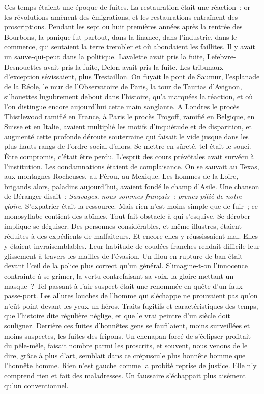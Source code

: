 \documentclass[french,twoside]{book} %
\begin{document}
Ces temps étaient une époque de fuites. La restauration était une réaction ; or les révolutions amènent des émigrations, et les restaurations entraînent des proscriptions. Pendant les sept ou huit premières années après la rentrée des Bourbons, la panique fut partout, dans la finance, dans l’industrie, dans le commerce, qui sentaient la terre trembler et où abondaient les faillites. Il y avait un sauve-qui-peut dans la politique. Lavalette avait pris la fuite, Lefebvre-Desnouettes avait pris la fuite, Delon avait pris la fuite. Les tribunaux d’exception sévissaient, plus Trestaillon. On fuyait le pont de Saumur, l’esplanade de la Réole, le mur de l’Observatoire de Paris, la tour de Taurias d’Avignon,  silhouettes lugubrement debout dans l’histoire, qu’a marquées la réaction, et où l’on distingue encore aujourd’hui cette main sanglante. A Londres le procès Thistlewood ramifié en France, à Paris le procès Trogoff, ramifié en Belgique, en Suisse et en Italie, avaient multiplié les motifs d’inquiétude et de disparition, et augmenté cette profonde déroute souterraine qui faisait le vide jusque dans les plus hauts rangs de l’ordre social d’alors. Se mettre en sûreté, tel était le souci. Être compromis, c’était être perdu. L’esprit des cours prévôtales avait survécu à l’institution. Les condamnations étaient de complaisance. On se sauvait au Texas, aux montagnes Rocheuses, au Pérou, au Mexique. Les hommes de la Loire, brigands alors, paladins aujourd’hui, avaient fondé le champ d’Asile. Une chanson de Béranger disait : \emph{Sauvages, nous sommes français ; prenez pitié de notre gloire}. S’expatrier était la ressource. Mais rien n’est moins simple que de fuir ; ce monosyllabe contient des abîmes. Tout fait obstacle à qui s’esquive. Se dérober implique se déguiser. Des personnes considérables, et même illustres, étaient réduites à des expédients de malfaiteurs. Et encore elles y réussissaient mal. Elles y étaient invraisemblables. Leur habitude de coudées franches rendait difficile leur glissement à travers les mailles de l’évasion. Un filou en rupture de ban était devant l’œil de la police plus correct qu’un général. S’imagine-t-on l’innocence contrainte à se grimer, la vertu contrefaisant sa voix, la gloire mettant un masque ? Tel passant à l’air suspect était une renommée en quête d’un faux passe-port.  Les allures louches de l’homme qui s’échappe ne prouvaient pas qu’on n’eût point devant les yeux un héros. Traits fugitifs et caractéristiques des temps, que l’histoire dite régulière néglige, et que le vrai peintre d’un siècle doit souligner. Derrière ces fuites d’honnêtes gens se faufilaient, moins surveillées et moins suspectes, les fuites des fripons. Un chenapan forcé de s’éclipser profitait du pêle-mêle, faisait nombre parmi les proscrits, et souvent, nous venons de le dire, grâce à plus d’art, semblait dans ce crépuscule plus honnête homme que l’honnête homme. Rien n’est gauche comme la probité reprise de justice. Elle n’y comprend rien et fait des maladresses. Un faussaire s’échappait plus aisément qu’un conventionnel.\par
\end{document}
